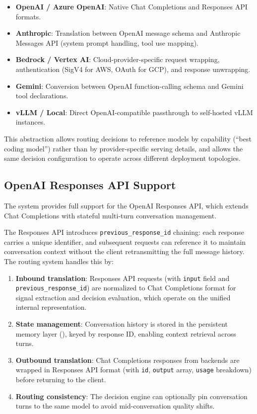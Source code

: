 \begin{itemize}[leftmargin=*]
  \item \textbf{OpenAI / Azure OpenAI}: Native Chat Completions and Responses API formats.
  \item \textbf{Anthropic}: Translation between OpenAI message schema and Anthropic Messages API (system prompt handling, tool use mapping).
  \item \textbf{Bedrock / Vertex AI}: Cloud-provider-specific request wrapping, authentication (SigV4 for AWS, OAuth for GCP), and response unwrapping.
  \item \textbf{Gemini}: Conversion between OpenAI function-calling schema and Gemini tool declarations.
  \item \textbf{vLLM / Local}: Direct OpenAI-compatible passthrough to self-hosted vLLM instances.
\end{itemize}

This abstraction allows routing decisions to reference models by capability (``best coding model'') rather than by provider-specific serving details, and allows the same decision configuration to operate across different deployment topologies.

\subsection{OpenAI Responses API Support}
\label{subsec:responses_api}

The system provides full support for the OpenAI Responses API, which extends Chat Completions with stateful multi-turn conversation management.

The Responses API introduces \texttt{previous\_response\_id} chaining: each response carries a unique identifier, and subsequent requests can reference it to maintain conversation context without the client retransmitting the full message history.
The routing system handles this by:

\begin{enumerate}[leftmargin=*]
  \item \textbf{Inbound translation}: Responses API requests (with \texttt{input} field and \texttt{previous\_response\_id}) are normalized to Chat Completions format for signal extraction and decision evaluation, which operate on the unified internal representation.
  \item \textbf{State management}: Conversation history is stored in the persistent memory layer (), keyed by response ID, enabling context retrieval across turns.
  \item \textbf{Outbound translation}: Chat Completions responses from backends are wrapped in Responses API format (with \texttt{id}, \texttt{output} array, \texttt{usage} breakdown) before returning to the client.
  \item \textbf{Routing consistency}: The decision engine can optionally pin conversation turns to the same model to avoid mid-conversation quality shifts.
\end{enumerate}

